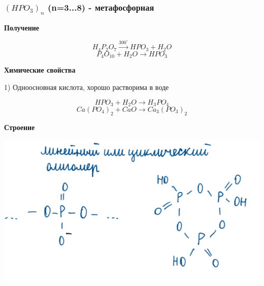 \subsubsection*{$(HPO_3)_n$ (n=3...8) - метафосфорная}

\textbf{Получение}

$$H_4P_2O_7 \xrightarrow{300^{\circ}} HPO_3 + H_2O$$
$$P_4O_10 + H_2O \rightarrow HPO_3$$

\textbf{Химические свойства}

1) Одноосновная кислота, хорошо растворима в воде

$$HPO_3 + H_2O \rightarrow H_3PO_4$$
$$Ca(PO_4)_2 + CaO \rightarrow Ca_3(PO_3)_2$$

\textbf{Строение}

\includegraphics{images/9v13.png}
